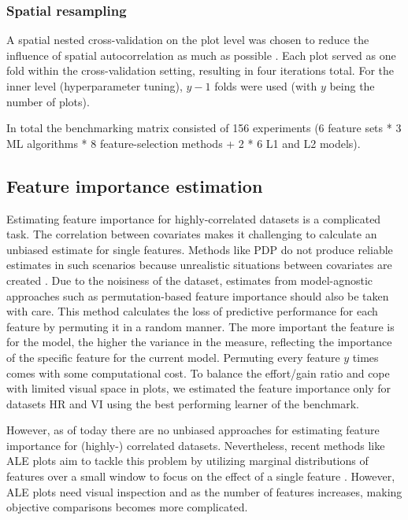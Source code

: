 \documentclass[letterpaper, peerreview]{IEEEtran}
\begin{document}
\subsubsection{Spatial resampling}

\noindent A spatial nested cross-validation on the plot level was chosen to reduce the influence of spatial autocorrelation as much as possible \cite{schratz2019, sperrorest}.
Each plot served as one fold within the cross-validation setting, resulting in four iterations total.
For the inner level (hyperparameter tuning), \(y - 1\) folds were used (with \(y\) being the number of plots).

In total the benchmarking matrix consisted of 156 experiments (6 feature sets * 3 ML algorithms * 8 feature-selection methods + 2 * 6 L1 and L2 models).

\subsection{Feature importance estimation}

\noindent Estimating feature importance for highly-correlated datasets is a complicated task.
The correlation between covariates makes it challenging to calculate an unbiased estimate for single features.
Methods like \ac{PDP} do not produce reliable estimates in such scenarios because unrealistic situations between covariates are created \cite{molnar2019}.
Due to the noisiness of the dataset, estimates from model-agnostic approaches such as permutation-based feature importance should also be taken with care.
This method calculates the loss of predictive performance for each feature by permuting it in a random manner.
The more important the feature is for the model, the higher the variance in the measure, reflecting the importance of the specific feature for the current model.
Permuting every feature $y$ times comes with some computational cost.
To balance the effort/gain ratio and cope with limited visual space in plots, we estimated the feature importance only for datasets HR and VI using the best performing learner of the benchmark.

However, as of today there are no unbiased approaches for estimating feature importance for (highly-) correlated datasets.
Nevertheless, recent methods like \ac{ALE} plots aim to tackle this problem by utilizing marginal distributions of features over a small window to focus on the effect of a single feature \cite{apley2019, molnar2019}.
However, ALE plots need visual inspection and as the number of features increases, making objective comparisons becomes more complicated.
\end{document}
